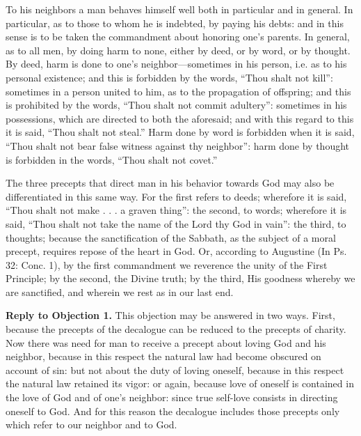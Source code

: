 To his neighbors a man behaves himself well both in particular and in general. In particular, as to those to whom he is indebted, by paying his debts: and in this sense is to be taken the commandment about honoring one's parents. In general, as to all men, by doing harm to none, either by deed, or by word, or by thought. By deed, harm is done to one's neighbor—sometimes in his person, i.e. as to his personal existence; and this is forbidden by the words, ``Thou shalt not kill'': sometimes in a person united to him, as to the propagation of offspring; and this is prohibited by the words, ``Thou shalt not commit adultery'': sometimes in his possessions, which are directed to both the aforesaid; and with this regard to this it is said, ``Thou shalt not steal.'' Harm done by word is forbidden when it is said, ``Thou shalt not bear false witness against thy neighbor'': harm done by thought is forbidden in the words, ``Thou shalt not covet.''

The three precepts that direct man in his behavior towards God may also be differentiated in this same way. For the first refers to deeds; wherefore it is said, ``Thou shalt not make . . . a graven thing'': the second, to words; wherefore it is said, ``Thou shalt not take the name of the Lord thy God in vain'': the third, to thoughts; because the sanctification of the Sabbath, as the subject of a moral precept, requires repose of the heart in God. Or, according to Augustine (In Ps. 32: Conc. 1), by the first commandment we reverence the unity of the First Principle; by the second, the Divine truth; by the third, His goodness whereby we are sanctified, and wherein we rest as in our last end.

\textbf{Reply to Objection 1.} This objection may be answered in two ways. First, because the precepts of the decalogue can be reduced to the precepts of charity. Now there was need for man to receive a precept about loving God and his neighbor, because in this respect the natural law had become obscured on account of sin: but not about the duty of loving oneself, because in this respect the natural law retained its vigor: or again, because love of oneself is contained in the love of God and of one's neighbor: since true self-love consists in directing oneself to God. And for this reason the decalogue includes those precepts only which refer to our neighbor and to God.

